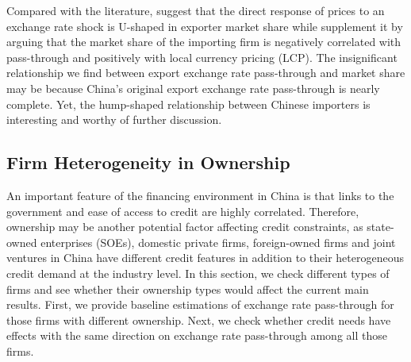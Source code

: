 \documentclass[12pt]{article}
\begin{document}
Compared with the literature, \cite{auer2016} suggest that the direct response of prices to an exchange rate shock is U-shaped in exporter market share while \cite{devereux2017} supplement it by arguing that the market share of the importing firm is negatively correlated with pass-through and positively with local currency pricing (LCP). The insignificant relationship we find between export exchange rate pass-through and market share may be because China's original export exchange rate pass-through is nearly complete. Yet, the hump-shaped relationship between Chinese importers is interesting and worthy of further discussion.

\subsection{Firm Heterogeneity in Ownership}

An important feature of the financing environment in China is that links to the government and ease of access to credit are highly correlated. Therefore, ownership may be another potential factor affecting credit constraints, as state-owned enterprises (SOEs), domestic private firms, foreign-owned firms and joint ventures in China have different credit features in addition to their heterogeneous credit demand at the industry level. In this section, we check different types of firms and see whether their ownership types would affect the current main results. First, we provide baseline estimations of exchange rate pass-through for those firms with different ownership. Next, we check whether credit needs have effects with the same direction on exchange rate pass-through among all those firms.
\end{document}
